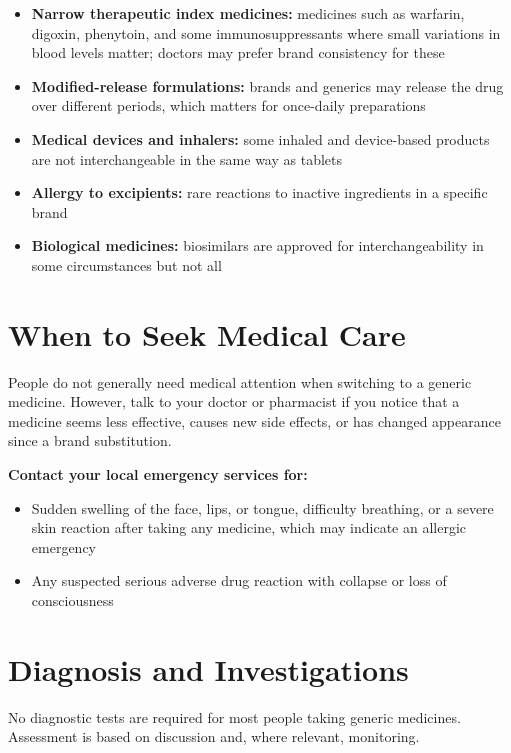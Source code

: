 \begin{itemize}
    \item \textbf{Narrow therapeutic index medicines:} medicines such as warfarin, digoxin, phenytoin, and some immunosuppressants where small variations in blood levels matter; doctors may prefer brand consistency for these
    \item \textbf{Modified-release formulations:} brands and generics may release the drug over different periods, which matters for once-daily preparations
    \item \textbf{Medical devices and inhalers:} some inhaled and device-based products are not interchangeable in the same way as tablets
    \item \textbf{Allergy to excipients:} rare reactions to inactive ingredients in a specific brand
    \item \textbf{Biological medicines:} biosimilars are approved for interchangeability in some circumstances but not all
\end{itemize}

\section*{When to Seek Medical Care}
People do not generally need medical attention when switching to a generic medicine. However, talk to your doctor or pharmacist if you notice that a medicine seems less effective, causes new side effects, or has changed appearance since a brand substitution.

\textbf{Contact your local emergency services for:}
\begin{itemize}
    \item Sudden swelling of the face, lips, or tongue, difficulty breathing, or a severe skin reaction after taking any medicine, which may indicate an allergic emergency
    \item Any suspected serious adverse drug reaction with collapse or loss of consciousness
\end{itemize}

\section*{Diagnosis and Investigations}
No diagnostic tests are required for most people taking generic medicines. Assessment is based on discussion and, where relevant, monitoring.

